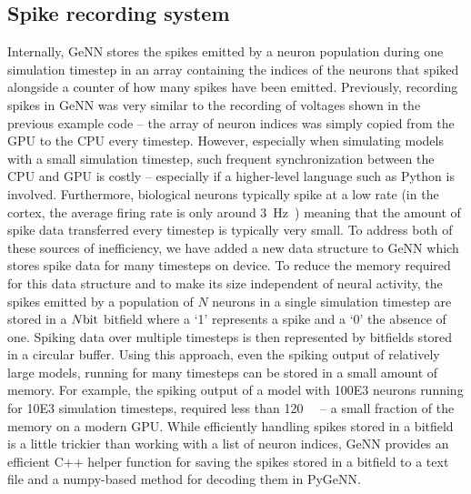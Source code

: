 \documentclass[utf8]{frontiersSCNS} %
\begin{document}
\subsection{Spike recording system}
\label{sec:methods/spike_recording}
Internally, GeNN stores the spikes emitted by a neuron population during one simulation timestep in an array containing the indices of the neurons that spiked alongside a counter of how many spikes have been emitted.
Previously, recording spikes in GeNN was very similar to the recording of voltages shown in the previous example code -- the array of neuron indices was simply copied from the GPU to the CPU every timestep.
However, especially when simulating models with a small simulation timestep, such frequent synchronization between the CPU and GPU is costly -- especially if a higher-level language such as Python is involved.
Furthermore, biological neurons typically spike at a low rate (in the cortex, the average firing rate is only around \SI{3}{\hertz}~\citep{Buzsaki2014}) meaning that the amount of spike data transferred every timestep is typically very small.
To address both of these sources of inefficiency, we have added a new data structure to GeNN which stores spike data for many timesteps on device.
To reduce the memory required for this data structure and to make its size independent of neural activity, the spikes emitted by a population of $N$ neurons in a single simulation timestep are stored in a $N\si{\bit}$ bitfield where a `1' represents a spike and a `0' the absence of one.
Spiking data over multiple timesteps is then represented by bitfields stored in a circular buffer.
Using this approach, even the spiking output of relatively large models, running for many timesteps can be stored in a small amount of memory.
For example, the spiking output of a model with \num{100E3} neurons running for \num{10E3} simulation timesteps, required less than \SI{120}{\mega\byte} -- a small fraction of the memory on a modern GPU.
While efficiently handling spikes stored in a bitfield is a little trickier than working with a list of neuron indices, GeNN provides an efficient C++ helper function for saving the spikes stored in a bitfield to a text file and a numpy-based method for decoding them in PyGeNN. 
\end{document}
